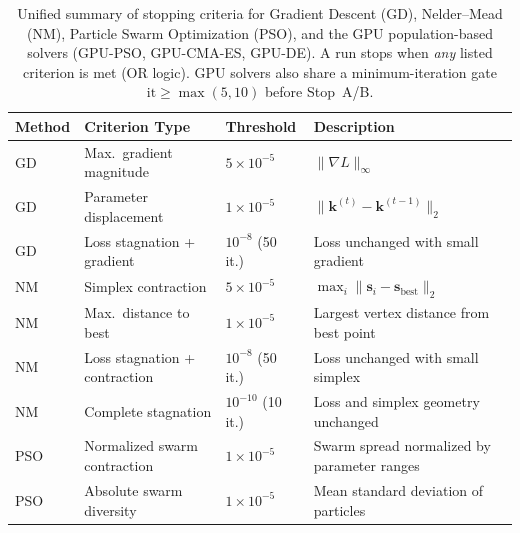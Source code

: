 %

\begin{table}[h]
\centering
\caption{Unified summary of stopping criteria for Gradient Descent (GD),
Nelder--Mead (NM), Particle Swarm Optimization (PSO), and the GPU
population-based solvers (GPU-PSO, GPU-CMA-ES, GPU-DE).
A run stops when \emph{any} listed criterion is met (OR logic).
GPU solvers also share a minimum-iteration gate
$\mathrm{it}\ge\max(5,10)$ before Stop~A/B.}
\label{tab:stopping_criteria_all}
\begin{tabular}{llll}
\hline
\textbf{Method} & \textbf{Criterion Type} & \textbf{Threshold} & \textbf{Description} \\
\hline
GD &
Max.\ gradient magnitude &
$5\times10^{-5}$ &
$\|\nabla L\|_\infty$ \\

GD &
Parameter displacement &
$1\times10^{-5}$ &
$\|\mathbf{k}^{(t)}-\mathbf{k}^{(t-1)}\|_2$ \\

GD &
Loss stagnation + gradient &
$10^{-8}$ (50 it.) &
Loss unchanged with small gradient \\

\hline
NM &
Simplex contraction &
$5\times10^{-5}$ &
$\max_i \|\mathbf{s}_i-\mathbf{s}_{\mathrm{best}}\|_2$ \\

NM &
Max.\ distance to best &
$1\times10^{-5}$ &
Largest vertex distance from best point \\

NM &
Loss stagnation + contraction &
$10^{-8}$ (50 it.) &
Loss unchanged with small simplex \\

NM &
Complete stagnation &
$10^{-10}$ (10 it.) &
Loss and simplex geometry unchanged \\

\hline
PSO &
Normalized swarm contraction &
$1\times10^{-5}$ &
Swarm spread normalized by parameter ranges \\

PSO &
Absolute swarm diversity &
$1\times10^{-5}$ &
Mean standard deviation of particles \\


\end{tabular}
\end{table}
